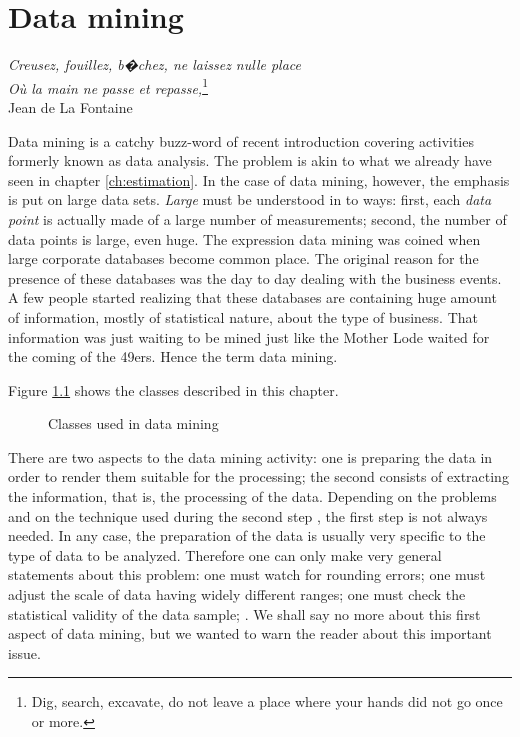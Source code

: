 \documentclass[twoside]{book}
\begin{document}
\fi

\chapter{Data mining} \vspace{1 ex}
\begin{flushright} {\sl Creusez, fouillez, b�chez, ne laissez nulle place}\\
{\sl O\`{u} la main ne passe et repasse,}\footnote{Dig, search,
excavate, do not leave a place where your hands did not go once or
more.}\\ Jean de La Fontaine
\end{flushright}
\vspace{1 ex} \label{ch:datamining} Data mining is a catchy
buzz-word of recent introduction covering activities formerly
known as data analysis. The problem is akin to what we already
have seen in chapter \ref{ch:estimation}. In the case of data
mining, however, the emphasis is put on large data sets. {\sl
Large} must be understood in to ways: first, each {\sl data point}
is actually made of a large number of measurements; second, the
number of data points is large, even huge. The expression data
mining was coined when large corporate databases become common
place. The original reason for the presence of these databases was
the day to day dealing with the business events. A few people
started realizing that these databases are containing huge amount
of information, mostly of statistical nature, about the type of
business. That information was just waiting to be mined just like
the Mother Lode waited for the coming of the 49ers. Hence the term
data mining.

Figure \ref{fig:dataminingclasses} shows the classes described in
this chapter.
\begin{figure}
\center{}
\caption{Classes used in data mining}\label{fig:dataminingclasses}
\end{figure}
There are two aspects to the data mining activity: one is
preparing the data in order to render them suitable for the
processing; the second consists of extracting the information,
that is, the processing of the data. Depending on the problems and
on the technique used during the second step , the first step is
not always needed. In any case, the preparation of the data is
usually very specific to the type of data to be analyzed.
Therefore one can only make very general statements about this
problem: one must watch for rounding errors; one must adjust the
scale of data having widely different ranges; one must check the
statistical validity of the data sample; \etc. We shall say no
more about this first aspect of data mining, but we wanted to warn
the reader about this important issue.
\end{document}
